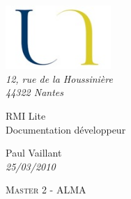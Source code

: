 \begin{titlepage}

\vspace*{2cm}



\begin{flushleft}
	\hspace{1cm} \includegraphics*[width=4cm]{img/logo.jpg}\\
	\hspace{1cm} \textsl{12, rue de la Houssinière}\\
	\hspace{1cm} \textit{44322 Nantes}
	\hrulefill
\end{flushleft}




\vspace{2cm}

\begin{flushright}

	{\fontsize{1.4cm}{1.65cm}\selectfont 
RMI Lite} 	 \\

	{\fontsize{0.7cm}{0.825cm}\selectfont 
Documentation développeur} 	 \\

	\vspace{1cm}

	Paul Vaillant \\

	\textit{25/03/2010}
	
\end{flushright}


\vspace{2cm}

\begin{flushleft}



	\hspace{1cm} \textsc{Master 2 - ALMA}\\
	
\end{flushleft}

\hspace*{0,5cm}\hrulefill
\end{titlepage}
